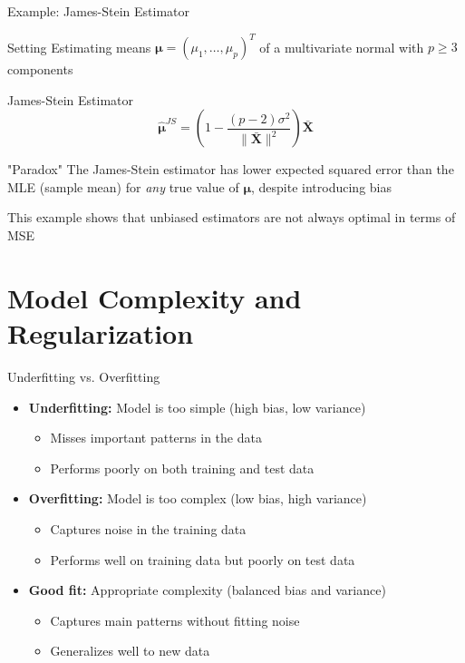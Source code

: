 \documentclass{beamer}
\begin{document}
\begin{frame}{Example: James-Stein Estimator}
  \begin{block}{Setting}
    Estimating means $\boldsymbol{\mu} = (\mu_1, \ldots, \mu_p)^T$ of a multivariate normal with $p \geq 3$ components
  \end{block}
  
  \begin{block}{James-Stein Estimator}
    \[
    \hat{\boldsymbol{\mu}}^{JS} = \left(1 - \frac{(p-2)\sigma^2}{\|\bar{\mathbf{X}}\|^2}\right) \bar{\mathbf{X}}
    \]
  \end{block}
  
  \begin{block}{"Paradox"}
    The James-Stein estimator has lower expected squared error than the MLE (sample mean) for \textit{any} true value of $\boldsymbol{\mu}$, despite introducing bias
  \end{block}
  
  This example shows that unbiased estimators are not always optimal in terms of MSE
\end{frame}

\section{Model Complexity and Regularization}

\begin{frame}{Underfitting vs. Overfitting}
  \begin{itemize}
    \item \textbf{Underfitting:} Model is too simple (high bias, low variance)
    \begin{itemize}
      \item Misses important patterns in the data
      \item Performs poorly on both training and test data
    \end{itemize}
    
    \item \textbf{Overfitting:} Model is too complex (low bias, high variance)
    \begin{itemize}
      \item Captures noise in the training data
      \item Performs well on training data but poorly on test data
    \end{itemize}
    
    \item \textbf{Good fit:} Appropriate complexity (balanced bias and variance)
    \begin{itemize}
      \item Captures main patterns without fitting noise
      \item Generalizes well to new data
    \end{itemize}
  \end{itemize}
\end{frame}
\end{document}
